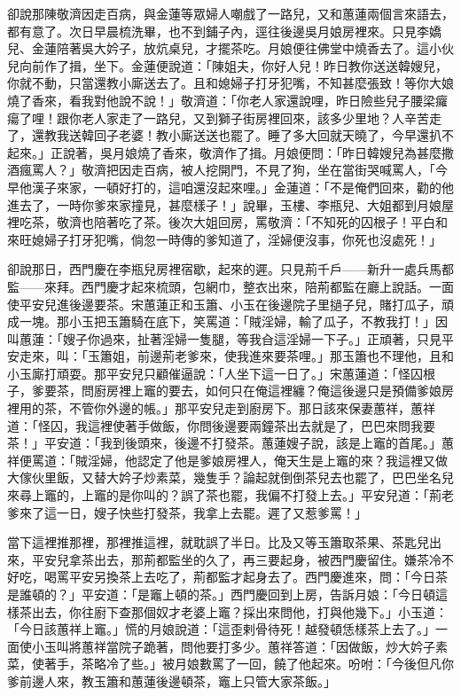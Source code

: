 卻說那陳敬濟因走百病，與金蓮等眾婦人嘲戲了一路兒，又和蕙蓮兩個言來語去，都有意了。次日早晨梳洗畢，也不到鋪子內，逕往後邊吳月娘房裡來。只見李嬌兒、金蓮陪著吳大妗子，放炕桌兒，才擺茶吃。月娘便往佛堂中燒香去了。這小伙兒向前作了揖，坐下。金蓮便說道：「陳姐夫，你好人兒！昨日教你送送韓嫂兒，你就不動，只當還教小廝送去了。且和媳婦子打牙犯嘴，不知甚麼張致！等你大娘燒了香來，看我對他說不說！」敬濟道：「你老人家還說哩，昨日險些兒子腰梁㿚瘍了哩！跟你老人家走了一路兒，又到獅子街房裡回來，該多少里地？人辛苦走了，還教我送韓回子老婆！教小廝送送也罷了。睡了多大回就天曉了，今早還扒不起來。」正說著，吳月娘燒了香來，敬濟作了揖。月娘便問：「昨日韓嫂兒為甚麼撒酒瘋罵人？」敬濟把因走百病，被人挖開門，不見了狗，坐在當街哭喊罵人，「今早他漢子來家，一頓好打的，這咱還沒起來哩。」金蓮道：「不是俺們回來，勸的他進去了，一時你爹來家撞見，甚麼樣子！」說畢，玉樓、李瓶兒、大姐都到月娘屋裡吃茶，敬濟也陪著吃了茶。後次大姐回房，罵敬濟：「不知死的囚根子！平白和來旺媳婦子打牙犯嘴，倘忽一時傳的爹知道了，淫婦便沒事，你死也沒處死！」

卻說那日，西門慶在李瓶兒房裡宿歇，起來的遲。只見荊千戶——新升一處兵馬都監——來拜。西門慶才起來梳頭，包網巾，整衣出來，陪荊都監在廳上說話。一面使平安兒進後邊要茶。宋蕙蓮正和玉簫、小玉在後邊院子里撾子兒，賭打瓜子，頑成一塊。那小玉把玉簫騎在底下，笑罵道：「賊淫婦，輸了瓜子，不教我打！」因叫蕙蓮：「嫂子你過來，扯著淫婦一隻腿，等我㒲這淫婦一下子。」正頑著，只見平安走來，叫：「玉簫姐，前邊荊老爹來，使我進來要茶哩。」那玉簫也不理他，且和小玉廝打頑耍。那平安兒只顧催逼說：「人坐下這一日了。」宋蕙蓮道：「怪囚根子，爹要茶，問廚房裡上竈的要去，如何只在俺這裡纏？俺這後邊只是預備爹娘房裡用的茶，不管你外邊的帳。」那平安兒走到廚房下。那日該來保妻蕙祥，蕙祥道：「怪囚，我這裡使著手做飯，你問後邊要兩鐘茶出去就是了，巴巴來問我要茶！」平安道：「我到後頭來，後邊不打發茶。蕙蓮嫂子說，該是上竈的首尾。」蕙祥便罵道：「賊淫婦，他認定了他是爹娘房裡人，俺天生是上竈的來？我這裡又做大傢伙里飯，又替大妗子炒素菜，幾隻手？論起就倒倒茶兒去也罷了，巴巴坐名兒來尋上竈的，上竈的是你叫的？誤了茶也罷，我偏不打發上去。」平安兒道：「荊老爹來了這一日，嫂子快些打發茶，我拿上去罷。遲了又惹爹罵！」

當下這裡推那裡，那裡推這裡，就耽誤了半日。比及又等玉簫取茶果、茶匙兒出來，平安兒拿茶出去，那荊都監坐的久了，再三要起身，被西門慶留住。嫌茶冷不好吃，喝罵平安另換茶上去吃了，荊都監才起身去了。西門慶進來，問：「今日茶是誰頓的？」平安道：「是竈上頓的茶。」西門慶回到上房，告訴月娘：「今日頓這樣茶出去，你往廚下查那個奴才老婆上竈？採出來問他，打與他幾下。」小玉道：「今日該蕙祥上竈。」慌的月娘說道：「這歪剌骨待死！越發頓恁樣茶上去了。」一面使小玉叫將蕙祥當院子跪著，問他要打多少。蕙祥答道：「因做飯，炒大妗子素菜，使著手，茶略冷了些。」被月娘數罵了一回，饒了他起來。吩咐：「今後但凡你爹前邊人來，教玉簫和蕙蓮後邊頓茶，竈上只管大家茶飯。」

